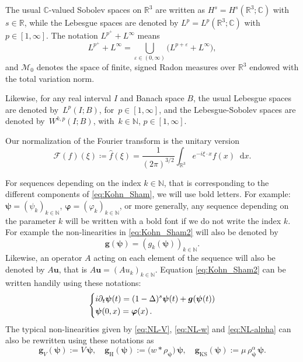 \documentclass[12pt,a4paper]{amsart}
\numberwithin{equation}{section}
\newcommand{\ulu}{\boldsymbol{u}}
\newcommand{\ulg}{\boldsymbol{g}}
\newcommand{\ulpsi}{\boldsymbol{\psi}}
\newcommand{\ulphi}{\boldsymbol{\varphi}}
\newcommand*\diff{\mathop{}\!\mathrm{d}}
\begin{document}
	The usual $\mathbb{C}$-valued Sobolev spaces on $\mathbb{R}^3$ are written as $H^s=H^s(\mathbb{R}^3;\mathbb{C})$ with $s \in \mathbb{R}$, while the Lebesgue spaces are denoted by $L^p=L^p(\mathbb{R}^3;\mathbb{C})$ with $p \in \left[1,\infty \right]$. The notation $L^{p^+}+L^\infty$ means
	\begin{equation*}
		L^{p^+}+L^\infty=\bigcup_{\varepsilon\in(0,\infty)}\big(L^{p+\varepsilon}+L^\infty\big),
	\end{equation*}
	and $\mathcal{M}_0$ denotes the space of finite, signed Radon measures over $\mathbb{R}^3$ endowed with the total variation norm.
	
	Likewise, for any real interval $I$ and Banach space $B$, the usual Lebesgue spaces are denoted by~$L^p(I;B)$, for~$p\in[1,\infty]$, and the Lebesgue-Sobolev spaces are denoted by~$W^{k,p}(I;B)$, with~$k\in\mathbb{N}$, $p\in[1,\infty]$. %
	
	Our normalization of the Fourier transform is the unitary version
	\begin{equation}
		\mathcal{F}(f)(\xi) \coloneq \hat{f}(\xi) = \frac{1}{(2 \pi)^{3/2}} \int_{\mathbb{R}^3}  e^{-i \xi \cdot x} f(x) \diff x.
	\end{equation}
	
	For sequences depending on the index $k \in \mathbb{N}$, that is corresponding to the different components of \eqref{eq:Kohn_Sham}, we will use bold letters. For example: 
	$\ulpsi=(\psi_k)_{k\in\mathbb{N}} $, $\ulphi=(\varphi_k)_{k\in\mathbb{N}}$, or more generally, any sequence depending on the parameter $k$ will be written with a bold font if we do not write the index $k$. For example the non-linearities in \eqref{eq:Kohn_Sham2} will also be denoted by
	\begin{equation}\label{eq:def-interaction}
		\boldsymbol{g}(\boldsymbol{\psi})=(g_{k}(\boldsymbol{\psi}))_{k\in\mathbb{N}} .
	\end{equation}
	Likewise, an operator $A$ acting on each element of the sequence will also be denoted by $A \ulu $, that is $A \ulu = (A u_k)_{k\in\mathbb{N}} $.
	Equation \eqref{eq:Kohn_Sham2} can be written handily using these notations:
	\begin{equation}\label{eq:Kohn-Sham-vectorised}
		\begin{dcases}
			i \partial_t \ulpsi(t) = (1-\Delta)^s \ulpsi(t) + \ulg (\ulpsi(t))  \\
			\ulpsi(0,x)=\ulphi(x) \,.
		\end{dcases}
	\end{equation}
	The typical non-linearities given by \eqref{eq:NL-V}, \eqref{eq:NL-w} and \eqref{eq:NL-alpha} can also be rewritten using these notations as
	\begin{equation}
		\ulg_V (\ulpsi) := V\,\ulpsi, \quad    \ulg_{\mathrm{H}} (\ulpsi) := \big(w \ast \rho_{\ulpsi}  \big) \, \ulpsi,\quad    \ulg_{\mathrm{KS}}(\ulpsi) := \mu\, \rho_{\ulpsi}^{\alpha}\, \ulpsi.
	\end{equation}
	
\end{document}
